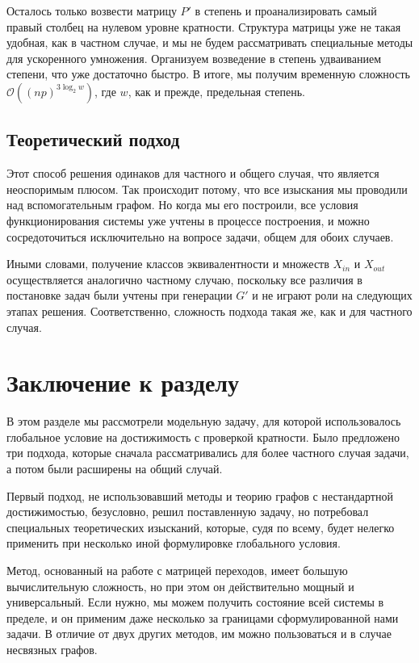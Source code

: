Осталось только возвести матрицу $P'$ в степень и проанализировать самый правый столбец на нулевом уровне кратности. Структура матрицы уже не такая удобная, как в частном случае, и мы не будем рассматривать специальные методы для ускоренного умножения. Организуем возведение в степень удваиванием степени, что уже достаточно быстро. В итоге, мы получим временную сложность $\mathcal{O}((np)^{3 \log_2 w})$, где $w$, как и прежде, предельная степень.

\subsection{Теоретический подход}

Этот способ решения одинаков для частного и общего случая, что является неоспоримым плюсом. Так происходит потому, что все изыскания мы проводили над вспомогательным графом. Но когда мы его построили, все условия функционирования системы уже учтены в процессе построения, и можно сосредоточиться исключительно на вопросе задачи, общем для обоих случаев. 

Иными словами, получение классов эквивалентности и множеств $X_{in}$ и $X_{out}$ осуществляется аналогично частному случаю, поскольку все различия в постановке задач были учтены при генерации $G'$ и не играют роли на следующих этапах решения. Соответственно, сложность подхода такая же, как и для частного случая. 

\section{Заключение к разделу}

В этом разделе мы рассмотрели модельную задачу, для которой использовалось глобальное условие на достижимость с проверкой кратности. Было предложено три подхода, которые сначала рассматривались для более частного случая задачи, а потом были расширены на общий случай. 

Первый подход, не использовавший методы и теорию графов с нестандартной достижимостью, безусловно, решил поставленную задачу, но потребовал специальных теоретических изысканий, которые, судя по всему, будет нелегко применить при несколько иной формулировке глобального условия. 

Метод, основанный на работе с матрицей переходов, имеет большую вычислительную сложность, но при этом он действительно мощный и универсальный. Если нужно, мы можем получить состояние всей системы в пределе, и он применим даже несколько за границами сформулированной нами задачи. В отличие от двух других методов, им можно пользоваться и в случае несвязных графов. 

